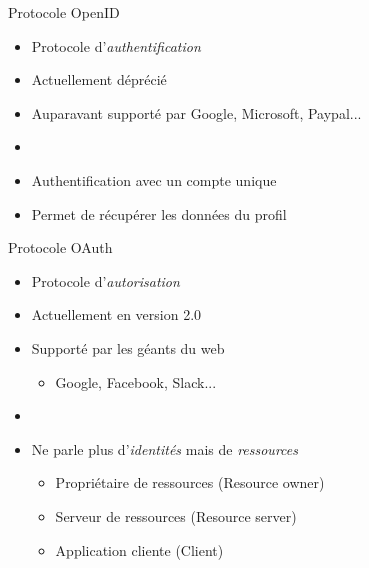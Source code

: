 \documentclass{beamer}
\begin{document}
\begin{frame}{Protocole OpenID}
  \begin{center}
    \begin{itemize}
      \item Protocole d'\emph{authentification}
      \item Actuellement déprécié
      \item Auparavant supporté par Google, Microsoft, Paypal...
      \item[~]
      \item Authentification avec un compte unique
      \item Permet de récupérer les données du profil
    \end{itemize}
  \end{center}
\end{frame}

\begin{frame}{Protocole OAuth}
  \begin{center}
    \begin{itemize}
      \item Protocole d'\emph{autorisation}
      \item Actuellement en version 2.0
      \item Supporté par les géants du web
      \begin{itemize}
        \item Google, Facebook, Slack...
      \end{itemize}
      \item[~]
      \item Ne parle plus d'\emph{identités} mais de \emph{ressources}
        \begin{itemize}
          \item Propriétaire de ressources (Resource owner)
          \item Serveur de ressources (Resource server)
          \item Application cliente (Client)
        \end{itemize}
    \end{itemize}
  \end{center}
\end{frame}
\end{document}
